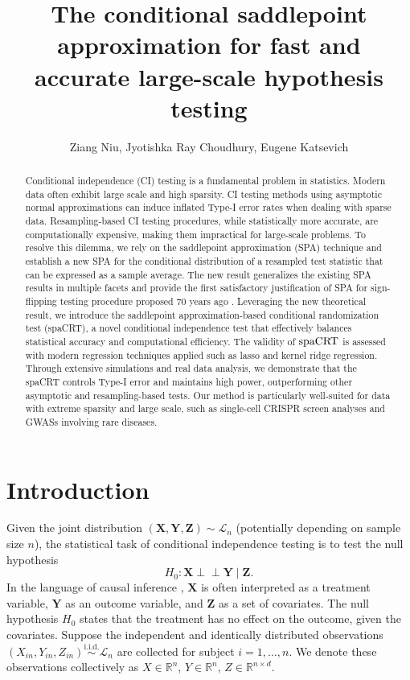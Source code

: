 \documentclass[12pt]{article}
\title{The conditional saddlepoint approximation for fast and accurate large-scale hypothesis testing}
\theoremstyle{definition}
\newcommand{\indep}{\perp \!\!\! \perp}
\newcommand{\R}{\mathbb{R}}								%
\newcommand{\iidsim}{\stackrel{\mathrm{i.i.d.}}{\sim}} 	%
\newcommand{\prx}{\bm X}								%
\newcommand{\srx}{X}									%
\newcommand{\prz}{\bm Z}								%
\newcommand{\srz}{Z}									%
\newcommand{\pry}{{\bm Y}}								%
\newcommand{\sry}{Y}									%
\newcommand{\law}{\mathcal L}							%
\newcommand{\spacrt}{\textnormal{spaCRT}}               %
\begin{document}
\author{Ziang Niu, Jyotishka Ray Choudhury, Eugene Katsevich}
\maketitle


\begin{abstract}
	Conditional independence (CI) testing is a fundamental problem in statistics. Modern data often exhibit large scale and high sparsity. CI testing methods using asymptotic normal approximations can induce inflated Type-I error rates when dealing with sparse data. Resampling-based CI testing procedures, while statistically more accurate, are computationally expensive, making them impractical for large-scale problems. To resolve this dilemma, we rely on the saddlepoint approximation (SPA) technique and establish a new SPA for the conditional distribution of a resampled test statistic that can be expressed as a sample average. The new result generalizes the existing SPA results in multiple facets and provide the first satisfactory justification of SPA for sign-flipping testing procedure proposed 70 years ago \citep{Daniels1955}. Leveraging the new theoretical result, we introduce the saddlepoint approximation-based conditional randomization test (spaCRT), a novel conditional independence test that effectively balances statistical accuracy and computational efficiency. The validity of $\spacrt$ is assessed with modern regression techniques applied such as lasso and kernel ridge regression. Through extensive simulations and real data analysis, we demonstrate that the spaCRT controls Type-I error and maintains high power, outperforming other asymptotic and resampling-based tests. Our method is particularly well-suited for data with extreme sparsity and large scale, such as single-cell CRISPR screen analyses and GWASs involving rare diseases.
\end{abstract}

  \section{Introduction} \label{sec:introduction}
  
  Given the joint distribution $(\prx, \pry, \prz) \sim \law_n$ (potentially depending on sample size $n$), the statistical task of conditional independence testing is to test the null hypothesis 
  \begin{equation}\label{eq:conditional-independent-null}
  H_0: \prx \indep \pry \mid \prz. 
  \end{equation}
  In the language of causal inference \citep{imbens2015causal}, $\prx$ is often interpreted as a treatment variable, $\pry$ as an outcome variable, and $\prz$ as a set of covariates. The null hypothesis $H_0$ states that the treatment has no effect on the outcome, given the covariates. Suppose the independent and identically distributed observations $(\srx_{in}, \sry_{in}, \srz_{in}) \iidsim \law_n$ are collected for subject $i = 1, \dots, n$. We denote these observations collectively as $\srx \in \R^n$, $\sry \in \R^n$, $\srz \in \R^{n \times d}$.
  
\end{document}

